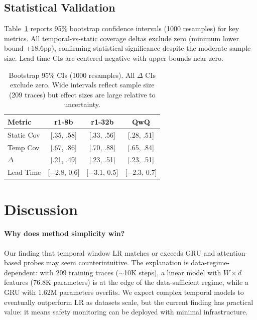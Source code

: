 \documentclass[11pt,a4paper]{article}
\begin{document}
\subsection{Statistical Validation}

Table~\ref{tab:bootstrap} reports 95\% bootstrap confidence intervals (1000 resamples) for key metrics.
All temporal-vs-static coverage deltas exclude zero (minimum lower bound +18.6pp), confirming statistical significance despite the moderate sample size.
Lead time CIs are centered negative with upper bounds near zero.

\begin{table}[t]
\centering
\small
\begin{tabular}{lccc}
\toprule
\textbf{Metric} & \textbf{r1-8b} & \textbf{r1-32b} & \textbf{QwQ} \\
\midrule
Static Cov & [.35, .58] & [.33, .56] & [.28, .51] \\
Temp Cov & [.67, .86] & [.70, .88] & [.65, .84] \\
$\Delta$ & [.21, .49] & [.23, .51] & [.23, .51] \\
Lead Time & [$-$2.8, 0.6] & [$-$3.1, 0.5] & [$-$2.3, 0.7] \\
\bottomrule
\end{tabular}
\caption{Bootstrap 95\% CIs (1000 resamples). All $\Delta$ CIs exclude zero.  Wide intervals reflect sample size (209 traces) but effect sizes are large relative to uncertainty.}
\label{tab:bootstrap}
\end{table}

\section{Discussion}

\paragraph{Why does method simplicity win?}
Our finding that temporal window LR matches or exceeds GRU and attention-based probes may seem counterintuitive.
The explanation is data-regime-dependent: with 209 training traces ($\sim$10K steps), a linear model with $W \times d$ features (76.8K parameters) is at the edge of the data-sufficient regime, while a GRU with 1.62M parameters overfits.
We expect complex temporal models to eventually outperform LR as datasets scale, but the current finding has practical value: it means safety monitoring can be deployed with minimal infrastructure.
\end{document}
